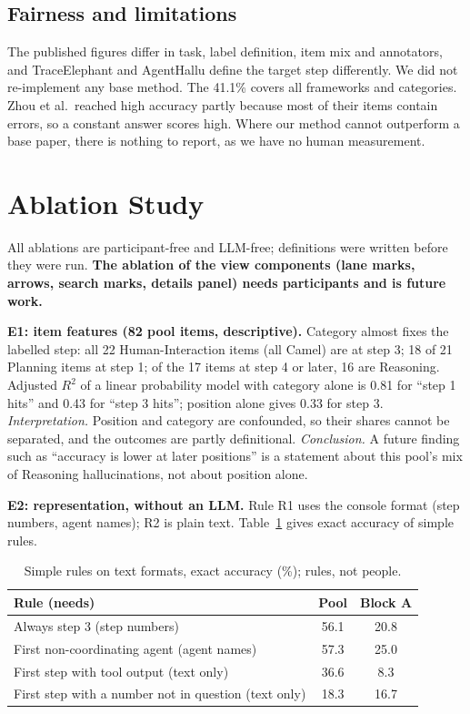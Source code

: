 \documentclass[conference]{IEEEtran}
\begin{document}
\subsection{Fairness and limitations}
The published figures differ in task, label definition, item mix and annotators, and TraceElephant and AgentHallu define the target step differently. We did not re-implement any base method. The 41.1\% covers all frameworks and categories. Zhou et al.\ reached high accuracy partly because most of their items contain errors, so a constant answer scores high. Where our method cannot outperform a base paper, there is nothing to report, as we have no human measurement.

\section{Ablation Study}\label{sec:ablation}
All ablations are participant-free and LLM-free; definitions were written before they were run. \textbf{The ablation of the view components (lane marks, arrows, search marks, details panel) needs participants and is future work.}

\textbf{E1: item features (82 pool items, descriptive).} Category almost fixes the labelled step: all 22 Human-Interaction items (all Camel) are at step 3; 18 of 21 Planning items at step 1; of the 17 items at step 4 or later, 16 are Reasoning. Adjusted $R^2$ of a linear probability model with category alone is 0.81 for ``step 1 hits'' and 0.43 for ``step 3 hits''; position alone gives 0.33 for step 3. \emph{Interpretation.} Position and category are confounded, so their shares cannot be separated, and the outcomes are partly definitional. \emph{Conclusion.} A future finding such as ``accuracy is lower at later positions'' is a statement about this pool's mix of Reasoning hallucinations, not about position alone.

\textbf{E2: representation, without an LLM.} Rule R1 uses the console format (step numbers, agent names); R2 is plain text. Table~\ref{tab:e2} gives exact accuracy of simple rules.

\begin{table}[t]
\centering\footnotesize
\caption{Simple rules on text formats, exact accuracy (\%); rules, not people.}
\label{tab:e2}
\begin{tabular}{@{}lcc@{}}
\toprule
Rule (needs) & Pool & Block A\\
\midrule
Always step 3 (step numbers) & 56.1 & 20.8\\
First non-coordinating agent (agent names) & 57.3 & 25.0\\
First step with tool output (text only) & 36.6 & 8.3\\
First step with a number not in question (text only) & 18.3 & 16.7\\
\bottomrule
\end{tabular}
\end{table}
\end{document}
